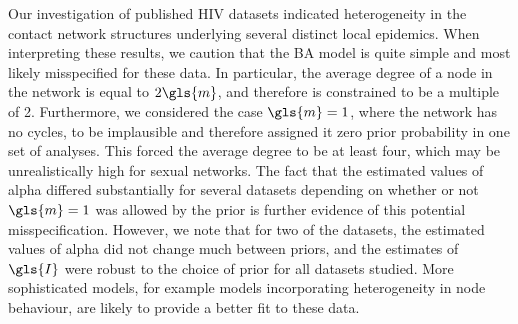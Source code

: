 Our investigation of published HIV datasets indicated heterogeneity in the
contact network structures underlying several distinct local epidemics. When
interpreting these results, we caution that the \gls{BA} model is quite simple
and most likely misspecified for these data. In particular, the average degree
of a node in the network is equal to $2\gls{m}$, and therefore is constrained
to be a multiple of 2. Furthermore, we considered the case $\gls{m} = 1$, where
the network has no cycles, to be implausible and therefore assigned it zero
prior probability in one set of analyses. This forced the average degree to be
at least four, which may be unrealistically high for sexual networks. The fact
that the estimated values of \gls{alpha} differed substantially for several
datasets depending on whether or not $\gls{m} = 1$ was allowed by the prior is
further evidence of this potential misspecification. However, we note that for
two of the datasets, the estimated values of \gls{alpha} did not change much
between priors, and the estimates of $\gls{I}$ were robust to the choice of
prior for all datasets studied. More sophisticated models, for example models
incorporating heterogeneity in node behaviour, are likely to provide a better
fit to these data.


